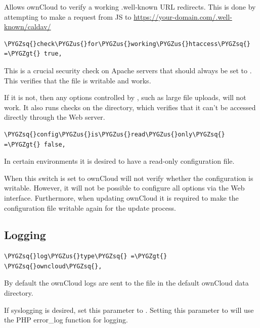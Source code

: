 \documentclass[letterpaper,10pt,english]{sphinxmanual}
\def\PYGZus{\char`\_}
\def\PYGZgt{\char`\>}
\def\PYGZsq{\char`\'}
\renewcommand\PYGZsq{\textquotesingle}
\begin{document}
Allows ownCloud to verify a working .well-known URL redirects. This is done
by attempting to make a request from JS to
\href{https://your-domain.com/.well-known/caldav/}{https://your-domain.com/.well-known/caldav/}

\begin{Verbatim}[commandchars=\\\{\}]
\PYGZsq{}check\PYGZus{}for\PYGZus{}working\PYGZus{}htaccess\PYGZsq{} =\PYGZgt{} true,
\end{Verbatim}

This is a crucial security check on Apache servers that should always be set
to . This verifies that the  file is writable and works.

If it is not, then any options controlled by , such as large
file uploads, will not work. It also runs checks on the  directory,
which verifies that it can't be accessed directly through the Web server.

\begin{Verbatim}[commandchars=\\\{\}]
\PYGZsq{}config\PYGZus{}is\PYGZus{}read\PYGZus{}only\PYGZsq{} =\PYGZgt{} false,
\end{Verbatim}

In certain environments it is desired to have a read-only configuration file.

When this switch is set to  ownCloud will not verify whether the
configuration is writable. However, it will not be possible to configure
all options via the Web interface. Furthermore, when updating ownCloud
it is required to make the configuration file writable again for the update
process.


\subsection{Logging}
\label{configuration_server/config_sample_php_parameters:logging}
\begin{Verbatim}[commandchars=\\\{\}]
\PYGZsq{}log\PYGZus{}type\PYGZsq{} =\PYGZgt{} \PYGZsq{}owncloud\PYGZsq{},
\end{Verbatim}

By default the ownCloud logs are sent to the  file in the
default ownCloud data directory.

If syslogging is desired, set this parameter to .
Setting this parameter to  will use the PHP error\_log function
for logging.
\end{document}
